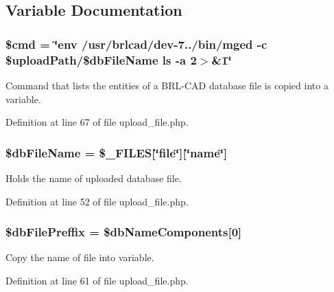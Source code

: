 \subsection{Variable Documentation}
\hypertarget{upload__file_8php_a9c87033fa49b61f753e3c263da5edeab}{
\subsubsection[{\$cmd}]{\setlength{\rightskip}{0pt plus 5cm}\$cmd = \char`\"{}env /usr/brlcad/dev-\/7../bin/mged -\/c \$upload\-Path/\$db\-File\-Name ls -\/a 2$>$\&1\char`\"{}}}\label{upload__file_8php_a9c87033fa49b61f753e3c263da5edeab}
Command that lists the entities of a B\-R\-L-\/\-C\-A\-D database file is copied into a variable. 

Definition at line 67 of file upload\-\_\-file.\-php.

\hypertarget{upload__file_8php_ab20da318c11da52be7a0bd751aa80ba2}{
\subsubsection[{\$db\-File\-Name}]{\setlength{\rightskip}{0pt plus 5cm}\$db\-File\-Name = \$\-\_\-\-F\-I\-L\-E\-S\mbox{[}\char`\"{}file\char`\"{}\mbox{]}\mbox{[}\char`\"{}name\char`\"{}\mbox{]}}}\label{upload__file_8php_ab20da318c11da52be7a0bd751aa80ba2}
Holds the name of uploaded database file. 

Definition at line 52 of file upload\-\_\-file.\-php.

\hypertarget{upload__file_8php_ad2ec2b4b4d7f2f14d90fa0a87387c143}{
\subsubsection[{\$db\-File\-Preffix}]{\setlength{\rightskip}{0pt plus 5cm}\$db\-File\-Preffix = \$db\-Name\-Components\mbox{[}0\mbox{]}}}\label{upload__file_8php_ad2ec2b4b4d7f2f14d90fa0a87387c143}
Copy the name of file into variable. 

Definition at line 61 of file upload\-\_\-file.\-php.

